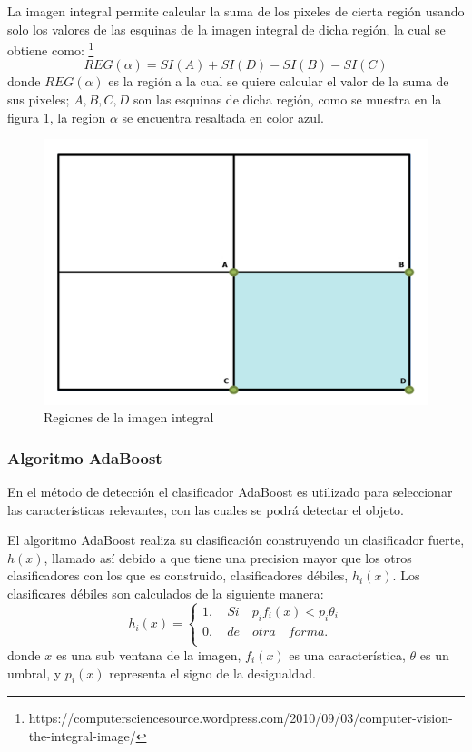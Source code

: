 La imagen integral permite calcular la suma de los pixeles de cierta región usando solo los valores de las esquinas de la imagen integral de dicha región, la cual se obtiene como: \footnote{https://computersciencesource.wordpress.com/2010/09/03/computer-vision-the-integral-image/}   
$$REG(\alpha)=SI(A)+SI(D)-SI(B)-SI(C)$$
donde $REG(\alpha)$ es la región a la cual se quiere calcular el valor de la suma de sus pixeles; $A,B,C,D$ son las esquinas de dicha región, como se muestra en la figura \ref{fig:figImageIntegral}, la region $\alpha$ se encuentra resaltada en color azul.  
\begin{figure}[h!]
\begin{center}
\includegraphics[scale=.3]{./Figures/IntegralImage.png}
\end{center}
\caption{Regiones de la imagen integral}
\label{fig:figImageIntegral}
\end{figure} 


\subsubsection{Algoritmo AdaBoost}\label{sssec:AdaboostClasifier}  

En el método de detección el clasificador AdaBoost es utilizado para seleccionar las características relevantes, con las cuales se podrá detectar el objeto. 

El algoritmo AdaBoost realiza su clasificación construyendo un clasificador fuerte, $h(x)$, llamado así debido a que tiene una precision mayor que los otros clasificadores con los que es construido, clasificadores débiles, $h_i(x)$. Los clasificares débiles son calculados de la siguiente manera: 
$$h_i(x)=
\begin{cases}   
1, \quad Si \quad  p_if_i(x)<p_i \theta_i \\
0, \quad de \quad otra \quad forma.\\
\end{cases}$$
donde $x$ es una sub ventana de la imagen, $f_i(x)$ es una característica, $\theta$ es un umbral, y $p_i(x)$ representa el signo de la desigualdad.   

